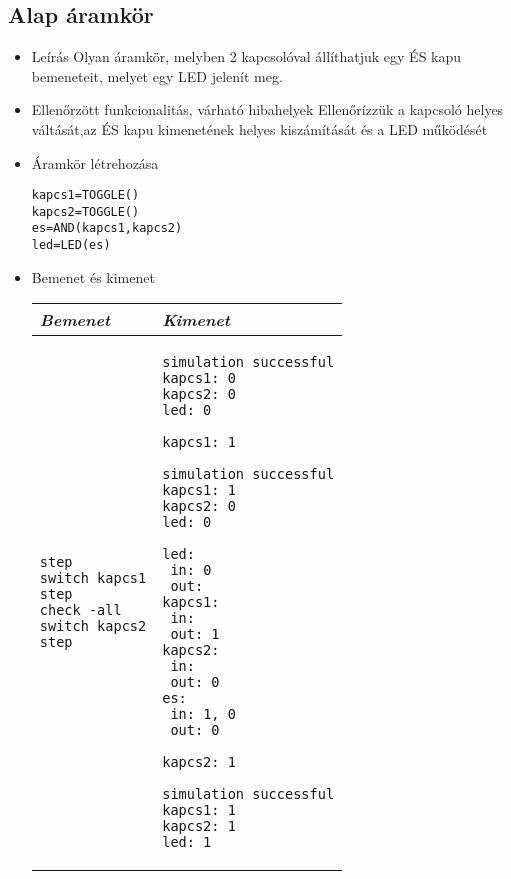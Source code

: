 \subsection{Alap áramkör}
\begin{itemize}
\item Leírás\newline
Olyan áramkör, melyben 2 kapcsolóval állíthatjuk egy ÉS kapu bemeneteit, melyet egy LED jelenít meg.
\item Ellenőrzött funkcionalitás, várható hibahelyek\newline
Ellenőrízzük a kapcsoló helyes váltását,az ÉS kapu kimenetének helyes kiszámítását és a LED működését
\item Áramkör létrehozása

\begin{verbatim}
kapcs1=TOGGLE()
kapcs2=TOGGLE()
es=AND(kapcs1,kapcs2)
led=LED(es)
\end{verbatim}

\item Bemenet és kimenet\newline

\begin{tabular}{|p{7cm}|p{7cm}|} 
\hline 
\textit{Bemenet} & \textit{Kimenet} \\ \hline
\begin{verbatim}
step
switch kapcs1
step
check -all
switch kapcs2
step
\end{verbatim}
& 
\begin{verbatim}
simulation successful
kapcs1: 0
kapcs2: 0
led: 0

kapcs1: 1

simulation successful
kapcs1: 1
kapcs2: 0
led: 0

led:
 in: 0
 out: 
kapcs1:
 in: 
 out: 1
kapcs2:
 in: 
 out: 0
es:
 in: 1, 0
 out: 0
 
kapcs2: 1

simulation successful
kapcs1: 1
kapcs2: 1
led: 1
\end{verbatim}
\\ \hline
\end{tabular}

\end{itemize}

